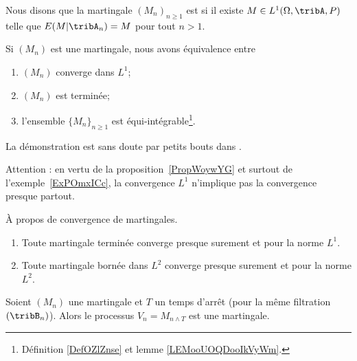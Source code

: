 \begin{definition}
	Nous disons que la martingale \( (M_n)_{n\geq 1}\) est  si il existe \( M\in L^1(\Omega,\tribA,P)\) telle que \( E(M|\tribA_n)=M\) pour tout \( n>1\).
\end{definition}

\begin{theorem} \label{ThoEFbpVXb}
	Si \( (M_n)\) est une martingale, nous avons équivalence entre
	\begin{enumerate}
		\item
		      \( (M_n)\) converge dans \( L^1\);
		\item
		      \( (M_n)\) est terminée;
		\item
		      l'ensemble \( \{ M_n \}_{n\geq 1}\) est équi-intégrable\footnote{Définition \ref{DefOZlZnse} et lemme \ref{LEMooUOQDooIkVyWm}.}.
	\end{enumerate}
\end{theorem}

La démonstration est sans doute par petits bouts dans \cite{BIBooYWQKooSdwvTG}.

Attention : en vertu de la proposition~\ref{PropWoywYG} et surtout de l'exemple~\ref{ExPOmxICc}, la convergence \( L^1\) n'implique pas la convergence presque partout.

\begin{theorem}   \label{ThoHBvnTRk}
	À propos de convergence de martingales.
	\begin{enumerate}
		\item
		      Toute martingale terminée converge presque surement et pour la norme \( L^1\).
		\item
		      Toute martingale bornée dans \( L^2\) converge presque surement et pour la norme \( L^2\).
	\end{enumerate}
\end{theorem}


\begin{proposition} \label{PropAYJpGsc}
	Soient \( (M_n)\) une martingale et \( T\) un temps d'arrêt (pour la même filtration \( (\tribB_n)\)). Alors le processus \( V_n=M_{n\wedge T}\) est une martingale.
\end{proposition}

